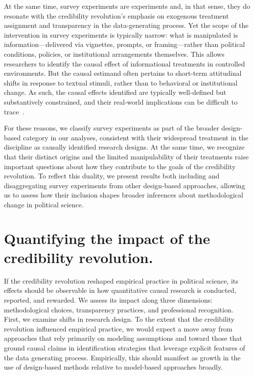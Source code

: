 \documentclass[12pt]{article}
\begin{document}
At the same time, survey experiments are experiments and, in that sense, they do resonate with the credibility revolution's emphasis on exogenous treatment assignment and transparency in the data-generating process. Yet the scope of the intervention in survey experiments is typically narrow: what is manipulated is information---delivered via vignettes, prompts, or framing---rather than political conditions, policies, or institutional arrangements themselves. This allows researchers to identify the causal effect of informational treatments in controlled environments. But the causal estimand often pertains to short-term attitudinal shifts in response to textual stimuli, rather than to behavioral or institutional change. As such, the causal effects identified are typically well-defined but substantively constrained, and their real-world implications can be difficult to trace~\citep{barabas2010survey}.

For these reasons, we classify survey experiments as part of the broader design-based category in our analyses, consistent with their widespread treatment in the discipline as causally identified research designs. At the same time, we recognize that their distinct origins and the limited manipulability of their treatments raise important questions about how they contribute to the goals of the credibility revolution. To reflect this duality, we present results both including and disaggregating survey experiments from other design-based approaches, allowing us to assess how their inclusion shapes broader inferences about methodological change in political science.

\section*{Quantifying the impact of the credibility revolution.} 

If the credibility revolution reshaped empirical practice in political science, its effects should be observable in how quantitative causal research is conducted, reported, and rewarded. We assess its impact along three dimensions: methodological choices, transparency practices, and professional recognition. First, we examine shifts in research design. To the extent that the credibility revolution influenced empirical practice, we would expect a move away from approaches that rely primarily on modeling assumptions and toward those that ground causal claims in identification strategies that leverage explicit features of the data generating process. Empirically, this should manifest as growth in the use of design-based methods relative to model-based approaches broadly.
\end{document}
